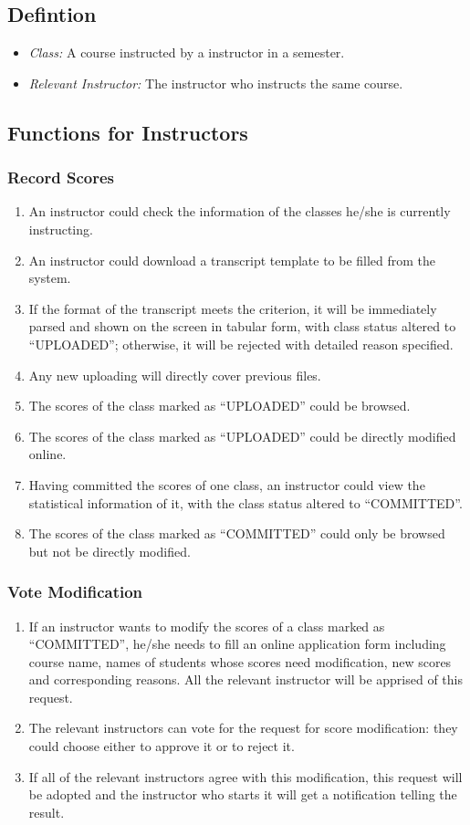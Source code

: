 \documentclass[a4]{article}
\begin{document}
\subsection{Defintion}
\begin{itemize}
\item \emph{Class:} A course instructed by a instructor in a semester.
\item \emph{Relevant Instructor:} The instructor who instructs the same course.
\end{itemize}

\subsection{Functions for Instructors}
\subsubsection{Record Scores}
\begin{enumerate}
\item An instructor could check the information of the classes he/she is currently instructing.
\item An instructor could download a transcript template to be filled from the system.
\item If the format of the transcript meets the criterion, it will be immediately parsed and shown on the screen in tabular form, with class status altered to ``UPLOADED''; otherwise, it will be rejected with detailed reason specified.
\item Any new uploading will directly cover previous files.
\item The scores of the class marked as ``UPLOADED'' could be browsed.
\item The scores of the class marked as ``UPLOADED'' could be directly modified online.
\item Having committed the scores of one class, an instructor could view the statistical information of it, with the class status altered to ``COMMITTED''.
\item The scores of the class marked as ``COMMITTED'' could only be browsed but not be directly modified.
\end{enumerate}

\subsubsection{Vote Modification}
\begin{enumerate}
\item If an instructor wants to modify the scores of a class marked as ``COMMITTED'', he/she needs to fill an online application form including course name, names of students whose scores need modification, new scores and corresponding reasons. All the relevant instructor will be apprised of this request.
\item The relevant instructors can vote for the request for score modification: they could choose either to approve it or to reject it.
\item If all of the relevant instructors agree with this modification, this request will be adopted and the instructor who starts it will get a notification telling the result.
\end{enumerate}
\end{document}
